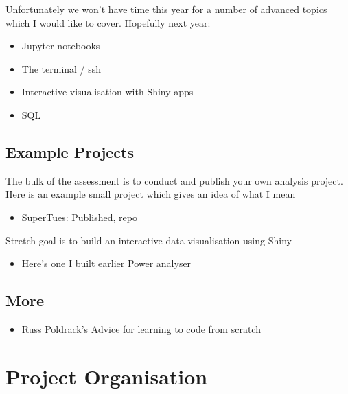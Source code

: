\documentclass[]{book}
\providecommand{\tightlist}{%
  \setlength{\itemsep}{0pt}\setlength{\parskip}{0pt}}
\begin{document}
Unfortunately we won't have time this year for a number of advanced
topics which I would like to cover. Hopefully next year:

\begin{itemize}
\tightlist
\item
  Jupyter notebooks
\item
  The terminal / ssh
\item
  Interactive visualisation with Shiny apps
\item
  SQL
\end{itemize}

\section{Example Projects}\label{example-projects}

The bulk of the assessment is to conduct and publish your own analysis
project. Here is an example small project which gives an idea of what I
mean

\begin{itemize}
\tightlist
\item
  SuperTues: \href{https://tomstafford.github.io/supertues/}{Published},
  \href{https://github.com/tomstafford/supertues}{repo}
\end{itemize}

Stretch goal is to build an interactive data visualisation using Shiny

\begin{itemize}
\tightlist
\item
  Here's one I built earlier
  \href{https://sheffield-university.shinyapps.io/decision_power/}{Power
  analyser}
\end{itemize}

\section{More}\label{more}

\begin{itemize}
\tightlist
\item
  Russ Poldrack's
  \href{http://www.russpoldrack.org/2016/05/advice-for-learning-to-code-from-scratch.html}{Advice
  for learning to code from scratch}
\end{itemize}

\chapter{Project Organisation}\label{project-organisation}
\end{document}
